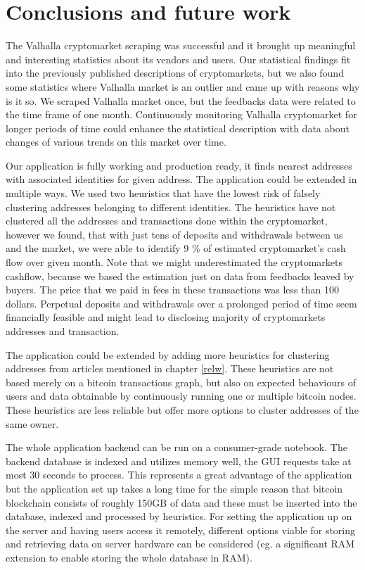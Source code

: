 \documentclass[
  digital, %
  table,   %
  lof,     %
  lot,     %
  oneside
]{fithesis3}
\begin{document}
\chapter{Conclusions and future work}

The Valhalla cryptomarket scraping was successful and
it brought up meaningful and interesting statistics about its vendors and users.
Our statistical findings fit into the previously published descriptions
of cryptomarkets, but we also found some statistics where Valhalla market is an outlier and
came up with reasons why is it so.
We scraped Valhalla market once, but the feedbacks data were
related to the time frame of one month. Continuously monitoring 
Valhalla cryptomarket for longer periods of time could enhance the statistical description
with data about changes of various trends on this market over time.

Our application is fully working and production ready, it 
finds nearest addresses with associated identities for given address.
The application could be extended in multiple ways. We used two
heuristics that have the lowest risk of falsely clustering addresses belonging to different identities.
The heuristics have not clustered all the addresses and transactions done within the cryptomarket,
however we found, that with just tens of deposits and withdrawals between us and the market,
we were able to identify 9 \% of estimated cryptomarket's cash flow over given month.
Note that we might underestimated the cryptomarkets cashflow, because we based
the estimation just on data from feedbacks leaved by buyers.
The price that we paid in fees in these transactions was less than 100 dollars. 
Perpetual deposits and withdrawals over a prolonged period of time seem financially feasible
and might lead to disclosing majority of cryptomarkets addresses and transaction.

The application could be extended by adding more heuristics for clustering addresses from articles mentioned
in chapter \ref{relw}.
These heuristics are not based merely on a bitcoin transactions graph, but also
on expected behaviours of users and data obtainable by continuously running one or multiple
bitcoin nodes. These heuristics are less reliable but offer more options to cluster addresses of the same owner.

The whole application backend can be run on a consumer-grade notebook. The backend database is indexed and utilizes memory well,
the GUI requests take at most 30 seconds to process. This represents a great advantage of the application but the application set up takes a long time for the simple reason that bitcoin
blockchain consists of roughly 150GB of data and these must be inserted into the database, indexed
and processed by heuristics.
For setting the application up on the server and having users access it remotely,
different options viable for storing and retrieving data on server hardware
can be considered (eg. a significant RAM extension to enable storing the whole database in RAM). 

\printbibliography{}
\end{document}
